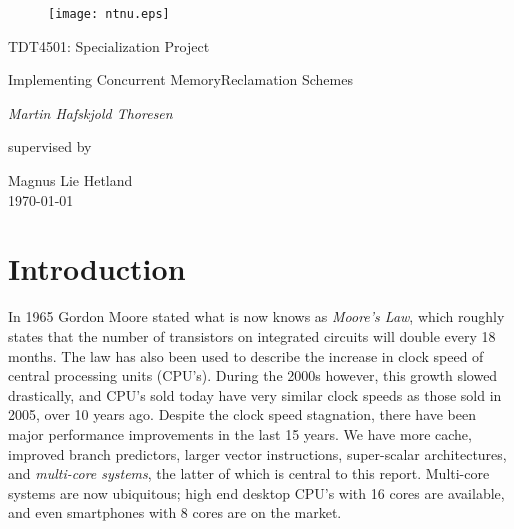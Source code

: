 \documentclass[b5paper]{report}
\begin{document}
\begin{titlepage}
	\centering
  \begin{figure}[h]
    \centering
    \texttt{[image: ntnu.eps]}
  \end{figure}
	\vspace{1.5cm}
	{\Large TDT4501: Specialization Project\par}
	\vspace{1cm}
	{\huge Implementing Concurrent Memory\linebreak Reclamation Schemes\par}
	\vspace{2cm}
  {\Large\itshape Martin Hafskjold Thoresen\par}
	\vfill
	supervised by\par
  \large Magnus Lie Hetland\\
	\vspace{1cm}
	{\large \today\\}
\end{titlepage}



\begin{abstract}
  In systems without a garbage collector dynamic allocated memory have to freed.
  In concurrent systems it is a hard problem to find out when shared memory is
  safe to free. In this report we look at two of the most used schemes for
  concurrent memory reclamation, \emph{Epoch Based Reclamation} and \emph{Hazard
  Pointers}, implementations of the two in the Rust programming language, and
  experimental results of their performance overhead.
\end{abstract}

\tableofcontents

\chapter{Introduction}

In 1965 Gordon Moore stated what is now knows as \emph{Moore's Law}, which
roughly states that the number of transistors on integrated circuits will double
every 18 months. The law has also been used to describe the increase in clock
speed of central processing units (CPU's). During the 2000s however, this growth
slowed drastically, and CPU's sold today have very similar clock speeds as those
sold in 2005, over 10 years ago. Despite the clock speed stagnation, there have
been major performance improvements in the last 15 years. We have more cache,
improved branch predictors, larger vector instructions, super-scalar
architectures, and \emph{multi-core systems}, the latter of which is central to
this report. Multi-core systems are now ubiquitous; high end desktop CPU's with
16 cores are available, and even smartphones with 8 cores are on the market.
\end{document}
